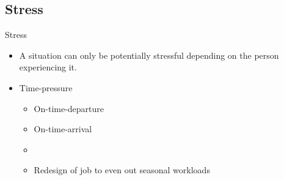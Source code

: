\subsection{Stress}
\begin{frame}{Stress}{}
    \begin{itemize}
        \item A situation can only be potentially stressful depending on the person experiencing it.
        \item Time-pressure
            \begin{itemize}
                \item On-time-departure
                \item On-time-arrival
        \item \item Redesign of job to even out seasonal workloads
            \end{itemize}
    \end{itemize}
\end{frame}